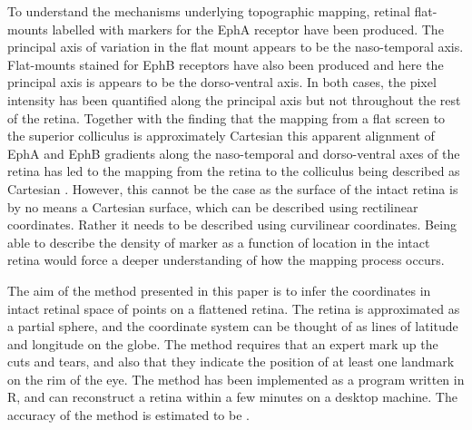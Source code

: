 \documentclass[10pt]{article}
\begin{document}
To understand the mechanisms underlying topographic mapping, retinal
flat-mounts labelled with markers for the EphA receptor
\cite{ChenEtal95comp} have been produced. The principal axis of
variation in the flat mount appears to be the naso-temporal axis.
Flat-mounts stained for EphB receptors have also been produced
\cite{BirgEtal00kina} and here the principal axis is appears to be the
dorso-ventral axis. In both cases, the pixel intensity has been
quantified along the principal axis but not throughout the rest of the
retina.  Together with the finding that the mapping from a flat screen
to the superior colliculus is approximately Cartesian
\cite{DragHube76topo} this apparent alignment of EphA and EphB
gradients along the naso-temporal and dorso-ventral axes of the retina
has led to the mapping from the retina to the colliculus being
described as Cartesian \cite{BeviEtal11gene}. However, this cannot be
the case as the surface of the intact retina is by no means a
Cartesian surface, which can be described using rectilinear
coordinates.  Rather it needs to be described using curvilinear
coordinates. Being able to describe the density of marker as a
function of location in the intact retina would force a deeper
understanding of how the mapping process occurs.


The aim of the method presented in this paper is to infer the
coordinates in intact retinal space of points on a flattened
retina. The retina is approximated as a partial sphere, and the
coordinate system can be thought of as lines of latitude and longitude
on the globe.  The method requires that an expert mark up the cuts and
tears, and also that they indicate the position of at least one
landmark on the rim of the eye. The method has been implemented as a
program written in R, and can reconstruct a retina within a few
minutes on a desktop machine. The accuracy of the method is estimated
to be .
\end{document}

